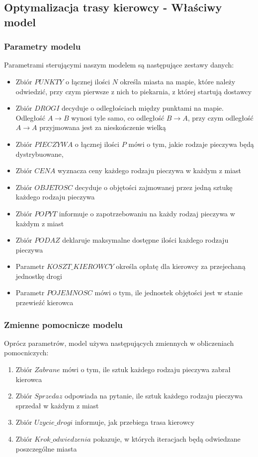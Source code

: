\documentclass[]{article}
\begin{document}
\subsection{Optymalizacja trasy kierowcy - Właściwy model}

\subsubsection{Parametry modelu}

Parametrami sterującymi naszym modelem są następujące zestawy danych:

\begin{itemize}
	\item Zbiór $PUNKTY$ o łącznej ilości $N$ określa miasta na mapie, które należy odwiedzić, przy czym pierwsze z nich to piekarnia, z której startują dostawcy
	\item Zbiór $DROGI$ decyduje o odległościach między punktami na mapie. Odległość $A \rightarrow B$ wynosi tyle samo, co odległość $B \rightarrow A$, przy czym odległość $A \rightarrow A$ przyjmowana jest za nieskończenie wielką
	\item Zbiór $PIECZYWA$ o łącznej ilości $P$ mówi o tym, jakie rodzaje pieczywa będą dystrybuowane,
	\item Zbiór $CENA$ wyznacza ceny każdego rodzaju pieczywa w każdym z miast
	\item Zbiór $OBJETOSC$ decyduje o objętości zajmowanej przez jedną sztukę każdego rodzaju pieczywa
	\item Zbiór $POPYT$ informuje o zapotrzebowaniu na każdy rodzaj pieczywa w każdym z miast
	\item Zbiór $PODAZ$ deklaruje maksymalne dostępne ilości każdego rodzaju pieczywa
	\item Parametr $KOSZT\_KIEROWCY$ określa opłatę dla kierowcy za przejechaną jednostkę drogi
	\item Parametr $POJEMNOSC$ mówi o tym, ile jednostek objętości jest w stanie przewieźć kierowca
\end{itemize}

\subsubsection{Zmienne pomocnicze modelu}

Oprócz parametrów, model używa następujących zmiennych w obliczeniach pomocniczych:

\begin{enumerate}
	\item Zbiór $Zabrane$ mówi o tym, ile sztuk każdego rodzaju pieczywa zabrał kierowca
	\item Zbiór $Sprzedaz$ odpowiada na pytanie, ile sztuk każdego rodzaju pieczywa sprzedał w każdym z miast
	\item Zbiór $Uzycie\_drogi$ informuje, jak przebiega trasa kierowcy 
	\item Zbiór $Krok\_odwiedzenia$ pokazuje, w których iteracjach będą odwiedzane poszczególne miasta
\end{enumerate}
\end{document}
